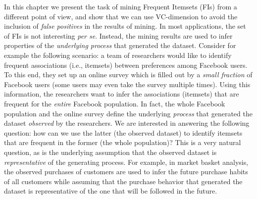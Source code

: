 
In this chapter we present the task of mining Frequent Itemsets (FIs) from a
different point of view, and show that we can use VC-dimension to avoid the
inclusion of \emph{false positives} in the results of mining. In most
applications, the set of FIs is not interesting \emph{per
se}. %
Instead, the mining results %
are used to infer properties of the \emph{underlying process} that generated the
dataset. Consider for example the following scenario: a team of researchers would like %
to identify frequent associations (i.e., itemsets) between preferences among
Facebook users. To this end, they set up an online survey %
which is filled out by a \emph{small fraction} of Facebook users (some users may even
take the survey multiple times). Using this information, the researchers want to
infer the associations (itemsets) that are frequent for the \emph{entire} Facebook
population. In fact, the %
 whole Facebook population and the online survey define the underlying \emph{process} that
generated the dataset \emph{observed} by the researchers. We are
interested in answering the following question: %
how can we use the latter (the observed dataset) to identify itemsets that are
frequent in the former (the whole population)?
This is a very natural question, as is the underlying assumption that the
observed dataset is \emph{representative} of the generating process. For
example, in market basket analysis, 
the observed purchases of customers are used to infer the future
purchase habits %
of all customers while assuming that %
the purchase behavior that generated the dataset is representative of the one
that will be followed in the future.


